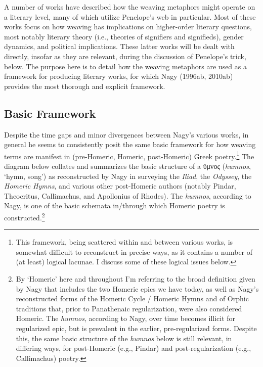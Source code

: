 \documentclass[12pt]{article}
\begin{document}
A number of works have described how the weaving metaphors might operate on a literary level, many of which utilize Penelope's web in particular. Most of these works focus on how weaving has implications on higher-order literary questions, most notably literary theory (i.e., theories of signifiers and signifieds), gender dynamics, and political implications. These latter works will be dealt with directly, insofar as they are relevant, during the discussion of Penelope's trick, below. The purpose here is to detail how the weaving metaphors are used as a framework for producing literary works, for which Nagy (1996ab, 2010ab) provides the most thorough and explicit framework. 

\subsection{Basic Framework}

Despite the time gaps and minor divergences between Nagy's various works, in general he seems to consistently posit the same basic framework for how weaving terms are manifest in (pre-Homeric, Homeric, post-Homeric) Greek poetry.\footnote{ This framework, being scattered within and between various works, is somewhat difficult to reconstruct in precise ways, as it contains a number of (at least) logical lacunae. I discuss some of these logical issues below.} The diagram below collates and summarizes the basic structure of a ὕμνος (\textit{humnos}, `hymn, song') as reconstructed by Nagy in surveying the \textit{Iliad}, the \textit{Odyssey}, the \textit{Homeric Hymns}, and various other post-Homeric authors (notably Pindar, Theocritus, Callimachus, and Apollonius of Rhodes). The \textit{humnos}, according to Nagy, is one of the basic schemata in/through which Homeric poetry is constructed.\footnote{ By `Homeric' here and throughout I'm referring to the broad definition given by Nagy that includes the two Homeric epics we have today, as well as Nagy's reconstructed forms of the Homeric Cycle / Homeric Hymns and of Orphic traditions that, prior to Panathenaic regularization, were also considered Homeric. The \textit{humnos}, according to Nagy, over time becomes illicit for regularized epic, but is prevalent in the earlier, pre-regularized forms. Despite this, the same basic structure of the \textit{humnos} below is still relevant, in differing ways, for post-Homeric (e.g., Pindar) and post-regularization (e.g., Callimachus) poetry.}
\end{document}
